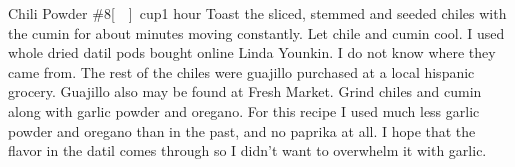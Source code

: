 \begin{recipe}{Chili Powder \#8}{\unit[]{cup}}{1 hour}
Toast the sliced, stemmed and seeded chiles with the cumin for about \unit[3--4]{minutes} moving constantly.  Let chile and cumin cool.
\freeform I used whole dried datil pods bought online Linda Younkin.  I do not know where they came from.  The rest of the chiles were guajillo purchased at a local hispanic grocery.  Guajillo also may be found at Fresh Market.
Grind chiles and cumin along with garlic powder and oregano.
\freeform For this recipe I used much less garlic powder and oregano than in the past, and no paprika at all.  I hope that the flavor in the datil comes through so I didn't want to overwhelm it with garlic.
\end{recipe}
